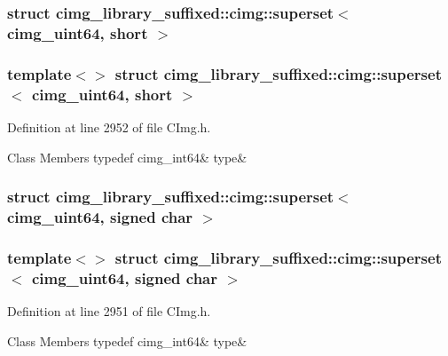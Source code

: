\subsubsection{struct cimg\+\_\+library\+\_\+suffixed\+:\+:cimg\+:\+:superset$<$ cimg\+\_\+uint64, short $>$}
\subsubsection*{template$<$$>$\newline
struct cimg\+\_\+library\+\_\+suffixed\+::cimg\+::superset$<$ cimg\+\_\+uint64, short $>$}



Definition at line 2952 of file C\+Img.\+h.

\begin{DoxyFields}{Class Members}
\mbox{\label{namespacecimg__library__suffixed_1_1cimg_a7220071b52a3082389bfdb8be752c234}} 
typedef cimg\_int64&
type&
\\
\hline

\end{DoxyFields}
\label{structcimg__library__suffixed_1_1cimg_1_1superset_3_01cimg__uint64_00_01signed_01char_01_4}
\subsubsection{struct cimg\+\_\+library\+\_\+suffixed\+:\+:cimg\+:\+:superset$<$ cimg\+\_\+uint64, signed char $>$}
\subsubsection*{template$<$$>$\newline
struct cimg\+\_\+library\+\_\+suffixed\+::cimg\+::superset$<$ cimg\+\_\+uint64, signed char $>$}



Definition at line 2951 of file C\+Img.\+h.

\begin{DoxyFields}{Class Members}
\mbox{\label{namespacecimg__library__suffixed_1_1cimg_a610a1a9e6a8e0ff415338cc92b234d7f}} 
typedef cimg\_int64&
type&
\\
\hline

\end{DoxyFields}
\label{structcimg__library__suffixed_1_1cimg_1_1superset_3_01float_00_01double_01_4}
